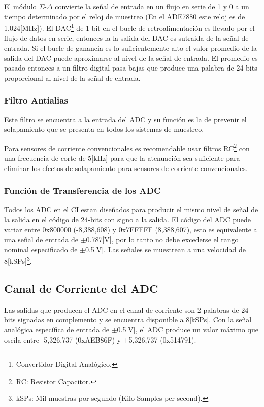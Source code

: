 \documentclass[letterpaper,12pt,oneside]{book}
\begin{document}
				El módulo $\Sigma$-$\Delta$ convierte la señal de entrada en un flujo en serie de 1 y 0 a un tiempo determinado por el reloj de muestreo (En el ADE7880 este reloj es de 1.024[MHz]). El DAC\footnote{Convertidor Digital Analógico.} de 1-bit en el bucle de retroalimentación es llevado por el flujo de datos en serie, entonces la la salida del DAC es sutraida de la señal de entrada. Si el bucle de ganancia es lo suficientemente alto el valor promedio de la salida del DAC puede aproximarse al nivel de la señal de entrada. El promedio es pasado entonces a un filtro digital pasa-bajas que produce una palabra de 24-bits proporcional al nivel de la señal de entrada.

				\subsubsection{Filtro Antialias}
				Este filtro se encuentra a la entrada del ADC y su función es la de prevenir el solapamiento que se presenta en todos los sistemas de muestreo.

				Para sensores de corriente convencionales es recomendable usar filtros RC\footnote{RC: Resistor Capacitor.} con una frecuencia de corte de 5[kHz] para que la atenuación sea suficiente para eliminar los efectos de solapamiento para sensores de corriente convencionales.

				\subsubsection{Función de Transferencia de los ADC}
				Todos los ADC en el CI estan diseñados para producir el mismo nivel de señal de la salida en el código de 24-bits con signo a la salida. El código del ADC puede variar entre 0x800000 (-8,388,608) y 0x7FFFFF (8,388,607), esto es equivalente a una señal de entrada de $\pm$0.787[V], por lo tanto no debe excederse el rango nominal especificado de $\pm$0.5[V]. Las señales se muestrean a una velocidad de 8[kSPs]\footnote{kSPs: Mil muestras por segundo (Kilo Samples per second).}.

			\subsection{Canal de Corriente del ADC}
			Las salidas que producen el ADC en el canal de corriente son 2 palabras de 24-bits signadas en complemento y se encuentra disponible a 8[kSPs]. Con la señal analógica específica de entrada de $\pm$0.5[V], el ADC produce un valor máximo que oscila entre -5,326,737 (0xAEB86F) y +5,326,737 (0x514791).
\end{document}
